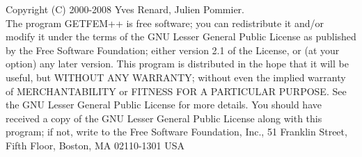 Copyright (C) 2000-2008 Yves Renard, Julien Pommier.\\
The program GETFEM++ is free software; you can redistribute it and/or modify
it under the terms of the GNU Lesser General Public License as published by
the Free Software Foundation; either version 2.1 of the License, or
(at your option) any later version.
This program is distributed in the hope that it will be useful,
but WITHOUT ANY WARRANTY; without even the implied warranty of
MERCHANTABILITY or FITNESS FOR A PARTICULAR PURPOSE.  See the
GNU Lesser General Public License for more details.
You should have received a copy of the GNU  Lesser General Public License
along with this program; if not, write to the Free Software Foundation,
Inc., 51 Franklin Street, Fifth Floor, Boston, MA  02110-1301  USA